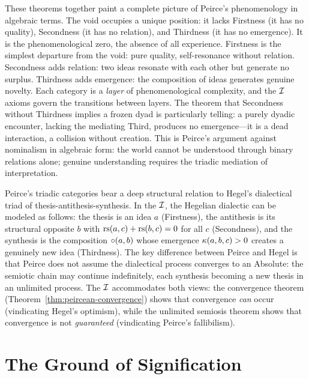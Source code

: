\begin{interpretation}
These theorems together paint a complete picture of Peirce's phenomenology in algebraic terms. The void occupies a unique position: it lacks Firstness (it has no quality), Secondness (it has no relation), and Thirdness (it has no emergence). It is the phenomenological zero, the absence of all experience. Firstness is the simplest departure from the void: pure quality, self-resonance without relation. Secondness adds relation: two ideas resonate with each other but generate no surplus. Thirdness adds emergence: the composition of ideas generates genuine novelty. Each category is a \emph{layer} of phenomenological complexity, and the $\mathcal{I}$ axioms govern the transitions between layers. The theorem that Secondness without Thirdness implies a frozen dyad is particularly telling: a purely dyadic encounter, lacking the mediating Third, produces no emergence---it is a dead interaction, a collision without creation. This is Peirce's argument against nominalism in algebraic form: the world cannot be understood through binary relations alone; genuine understanding requires the triadic mediation of interpretation.
\end{interpretation}

\begin{remark}
Peirce's triadic categories bear a deep structural relation to Hegel's dialectical triad of thesis-antithesis-synthesis. In the $\mathcal{I}$, the Hegelian dialectic can be modeled as follows: the thesis is an idea $a$ (Firstness), the antithesis is its structural opposite $b$ with $\mathrm{rs}(a, c) + \mathrm{rs}(b, c) = 0$ for all $c$ (Secondness), and the synthesis is the composition $\circ(a, b)$ whose emergence $\kappa(a, b, c) > 0$ creates a genuinely new idea (Thirdness). The key difference between Peirce and Hegel is that Peirce does not assume the dialectical process converges to an Absolute: the semiotic chain may continue indefinitely, each synthesis becoming a new thesis in an unlimited process. The $\mathcal{I}$ accommodates both views: the convergence theorem (Theorem~\ref{thm:peircean-convergence}) shows that convergence \emph{can} occur (vindicating Hegel's optimism), while the unlimited semiosis theorem shows that convergence is not \emph{guaranteed} (vindicating Peirce's fallibilism).
\end{remark}

\section{The Ground of Signification}

